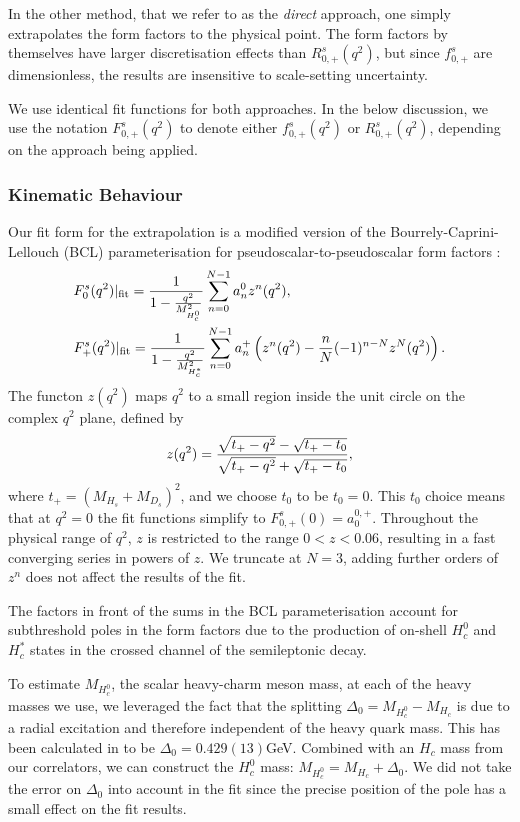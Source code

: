 In the other method, that we refer to as the {\textit{direct}} approach, one simply extrapolates the form factors to the physical point. The form factors by themselves have larger discretisation effects than $R_{0,+}^s(q^2)$, but since $f^s_{0,+}$ are dimensionless, the results are insensitive to scale-setting uncertainty.

We use identical fit functions for both approaches. In the below discussion, we use the notation $F^s_{0,+}(q^2)$ to denote either $f^s_{0,+}(q^2)$ or $R_{0,+}^s(q^2)$, depending on the approach being applied.

\subsubsection{Kinematic Behaviour}

Our fit form for the extrapolation is a modified version of the Bourrely-Caprini-Lellouch (BCL) parameterisation for pseudoscalar-to-pseudoscalar form factors \cite{Bourrely:2008za}:
\begin{align}
  \label{eq:BCL}
  &F^s_0(q^2)|_{\text{fit}} = {1\over 1 - {q^2\over M_{H_c^0}^2} } \sum_{n=0}^{N-1} a_n^0 z^n(q^2), \\
  &F^s_+(q^2)|_{\text{fit}} = {1\over 1 - {q^2\over M_{H_c^*}^2} } \sum_{n=0}^{N-1} a_n^+ \left( z^n(q^2) - {n\over N} (-1)^{n-N} z^N(q^2) \right). \nonumber
\end{align}
The functon $z(q^2)$ maps $q^2$ to a small region inside the unit circle on the complex $q^2$ plane, defined by
\begin{align}
  z(q^2) = {\sqrt{t_+ - q^2} - \sqrt{t_+ - t_0} \over \sqrt{t_+ - q^2} + \sqrt{t_+ - t_0} },
\end{align}
where $t_+ = (M_{H_s}+M_{D_s})^2$, and we choose $t_0$ to be $t_0 = 0$. This $t_0$ choice means that at $q^2=0$ the fit functions simplify to $F_{0,+}^s(0) = a_0^{0,+}$. Throughout the physical range of $q^2$, $z$ is restricted to the range $0<z<0.06$, resulting in a fast converging series in powers of $z$. We truncate at $N=3$, adding further orders of $z^n$ does not affect the results of the fit.

The factors in front of the sums in the BCL parameterisation account for subthreshold poles in the form factors due to the production of on-shell $H_c^0$ and $H_c^*$ states in the crossed channel of the semileptonic decay.

To estimate $M_{H_c^0}$, the scalar heavy-charm meson mass, at each of the heavy masses we use, we leveraged the fact that the splitting $\Delta_0 = M_{H_c^0} - M_{H_c}$ is due to a radial excitation and therefore independent of the heavy quark mass. This has been calculated in \cite{Dowdall:2012ab} to be $\Delta_0 = 0.429(13)$GeV. Combined with an $H_c$ mass from our correlators, we can construct the $H_c^0$ mass: $M_{H_c^0} = M_{H_c} + \Delta_0$. We did not take the error on $\Delta_0$ into account in the fit since the precise position of the pole has a small effect on the fit results.

